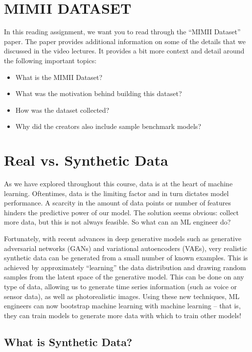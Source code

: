   \section{MIMII DATASET}
  
  In this reading assignment, we want you to read through the “MIMII Dataset” paper. The paper provides additional information on some of the details that we discussed in the video lectures. It provides a bit more context and detail around the following important topics:
  
  \begin{itemize}
    \item What is the MIMII Dataset?
    \item   What was the motivation behind building this dataset?
    \item   How was the dataset collected?
    \item   Why did the creators also include sample benchmark models?
  \end{itemize}
  
  \section{Real vs. Synthetic Data}
  
  As we have explored throughout this course, data is at the heart of machine learning. Oftentimes, data is the limiting factor and in turn dictates model performance. A scarcity in the amount of data points or number of features hinders the predictive power of our model. The solution seems obvious: collect more data, but this is not always feasible. So what can an ML engineer do?
  
  Fortunately, with recent advances in deep generative models such as generative adversarial networks (GANs) and variational autoencoders (VAEs), very realistic synthetic data can be generated from a small number of known examples. This is achieved by approximately “learning” the data distribution and drawing random samples from the latent space of the generative model. This can be done on any type of data, allowing us to generate time series information (such as voice or sensor data), as well as photorealistic images. Using these new techniques, ML engineers can now bootstrap machine learning with machine learning -- that is, they can train models to generate more data with which to train other models!
  
  \subsection{What is Synthetic Data?}
  
